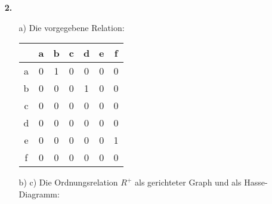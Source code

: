 \documentclass[a4paper,10pt]{scrartcl}
\begin{document}
\begin{enumerate}
\begin{enumerate}
        \end{enumerate}

    \item[\textbf{2.}]
        \begin{enumerate}
            \item[a)]
                Die vorgegebene Relation:

                \vspace{0.5cm}
                \begin{minipage}[c]{0.3\textwidth}
                    \centering
                \end{minipage}
                \begin{minipage}[c]{0.5\textwidth}
                    \centering
                    \begin{tabular}{c|cccccc}
                        & a & b & c & d & e & f\\
                        \hline
                        a & 0 & 1 & 0 & 0 & 0 & 0\\
                        b & 0 & 0 & 0 & 1 & 0 & 0\\
                        c & 0 & 0 & 0 & 0 & 0 & 0\\
                        d & 0 & 0 & 0 & 0 & 0 & 0\\
                        e & 0 & 0 & 0 & 0 & 0 & 1\\
                        f & 0 & 0 & 0 & 0 & 0 & 0\\
                    \end{tabular}
                \end{minipage}
                \vspace{0.5cm}

            \item[b) c)]
                Die Ordnungsrelation $R^+$ als gerichteter Graph und als Hasse-Diagramm:


\end{enumerate}
\end{enumerate}
\end{document}
